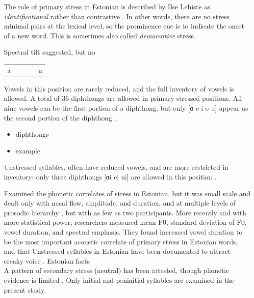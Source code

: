 The role of primary stress in Estonian is described by Ilse Lehiste as {\it identificational} rather than contrastive \citep{lehistePhoneticsMetrics1992}. In other words, there are no stress minimal pairs at the lexical level, so the prominence cue is to indicate the onset of a new word. This is sometimes also called {\it demarcative} stress.

Spectral tilt suggested, but no
\cite{sluijterSpectralBalanceAcoustic1996, lippusAcousticStudyEstonian2014a} \\


\begin{table}
\centering
\begin{tabular}{lcccr}
a & & & & u \\
\end{tabular}
\label{vowelinv} 
\end{table}
Vowels in this position are rarely reduced, and the full inventory of vowels is allowed. A total of 36 diphthongs are allowed in primary stressed positions. All nine vowels can be the first portion of a diphthong, but only [ɑ e i o u] appear as the second portion of the diphthong \citep{asuEstonian2009}. 

\begin{itemize}
\item diphthongs 
\item example
\end{itemize}


Unstressed syllables, often have reduced vowels, and are more restricted in inventory: only three diphthongs [ɑi ei ui] are allowed in this position \citep{lippusAcousticStudyEstonian2014a}. 

Examined the phonetic correlates of stress in Estonian, but it was small scale and dealt only with nasal flow, amplitude, and duration, and at multiple levels of prosodic hierarchy \citep{gordonPhoneticCorrelatesStress1997}, but with as few as two participants. 
More recently and with more statistical power, researchers measured mean F0, standard deviation of F0, vowel duration, and spectral emphasis. They found increased vowel duration to be the most important acoustic correlate of primary stress in Estonian words, and that Unstressed syllables in Estonian have been documented to attract creaky voice \citep{lippusAcousticStudyEstonian2014a}. 
Estonian facts \cite{alma991001659729706011} \\
A pattern of secondary stress (neutral) has been attested, though phonetic evidence is limited \citep{asuAcousticCorrelatesSecondary2018}. Only initial and peninitial syllables are examined in the present study.

